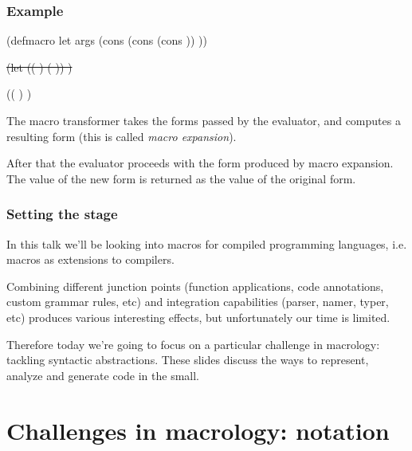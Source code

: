 \documentclass[hyperref={bookmarks=false}]{beamer}
\begin{document}
\begin{frame}[fragile]
\frametitle{Example} %

\begin{lstlistinglike}
\begin{semiverbatim}
(defmacro let args
  (cons
   (cons \text{\color{blue}{'lambda}}
         (cons \text{\color{red}{(map car (car args))}}
               \text{\color{violet}{(cdr args)}}))
   \text{\color{teal}{(map cadr (car args))}}))

\sout{(let ((\text{\color{red}{x}} \text{\color{teal}{40}}) (\text{\color{red}{y}} \text{\color{teal}{2}})) \text{\color{violet}{(print (+ x y))}})}

((\text{\color{blue}{lambda}} \text{\color{red}{(x y)}} \text{\color{violet}{(print (+ x y))}}) \text{\color{teal}{(40 2)}})
\end{semiverbatim}
\end{lstlistinglike}

The macro transformer takes the forms passed by the evaluator,
and computes a resulting form (this is called \emph{macro expansion}).

After that the evaluator proceeds with the form produced by macro expansion.
The value of the new form is returned as the value of the original form.
\end{frame}

\begin{frame}[fragile]
\frametitle{Setting the stage}

In this talk we'll be looking into macros for compiled programming languages,
i.e. macros as extensions to compilers.

Combining different junction points (function applications, code annotations, custom grammar rules, etc)
and integration capabilities (parser, namer, typer, etc) produces various interesting effects,
but unfortunately our time is limited.

Therefore today we're going to focus on a particular challenge in macrology: tackling syntactic abstractions.
These slides discuss the ways to represent, analyze and generate code in the small.
\end{frame}

\section{Challenges in macrology: notation}
\end{document}
